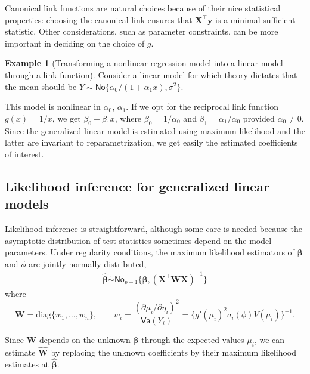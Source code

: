 \documentclass[
  11pt,
  letterpaper,
]{book}
\theoremstyle{definition}
\theoremstyle{definition}
\newtheorem{example}{Example}[chapter]
\theoremstyle{definition}
\theoremstyle{definition}
\theoremstyle{remark}
\begin{document}
Canonical link functions are natural choices because of their nice
statistical properties: choosing the canonical link ensures that
\(\mathbf{X}^\top\boldsymbol{y}\) is a minimal sufficient statistic. Other
considerations, such as parameter constraints, can be more important in
deciding on the choice of \(g\).

\begin{example}[Transforming a nonlinear regression model into a linear model through a link function]
\protect\hypertarget{exm:inverslinklm}{}{\label{exm:inverslinklm} {} }
Consider a linear model for which theory dictates that the mean should be \(Y \sim \mathsf{No}\{\alpha_0/(1+\alpha_1x), \sigma^2\}\).

This model is nonlinear in \(\alpha_0\), \(\alpha_1\). If we opt for the reciprocal link function \(g(x)=1/x\), we get \(\beta_0+\beta_1 x\), where \(\beta_0 = 1/\alpha_0\) and \(\beta_1 = \alpha_1/\alpha_0\) provided \(\alpha_0 \neq 0\). Since the generalized linear model is estimated using maximum likelihood and the latter are invariant to reparametrization, we get easily the estimated coefficients of interest.
\end{example}

\hypertarget{likelihood-inference-for-generalized-linear-models}{%
\subsection{Likelihood inference for generalized linear models}\label{likelihood-inference-for-generalized-linear-models}}

Likelihood inference is straightforward, although some care is needed because the asymptotic distribution of test statistics sometimes depend on the model parameters. Under regularity conditions, the maximum likelihood estimators of \(\boldsymbol{\beta}\) and \(\phi\) are jointly normally distributed,
\begin{align*}
\widehat{\boldsymbol{\beta}} \stackrel{\cdot}{\sim}\mathsf{No}_{p+1}\{\boldsymbol{\beta}, (\mathbf{X}^\top\mathbf{W}\mathbf{X})^{-1}\}
\end{align*}
where
\[\mathbf{W} = \mathrm{diag}\{w_1,\ldots, w_n\}, \qquad w_i = \frac{\left(\partial \mu_i/\partial \eta_i\right)^2}{\mathsf{Va}(Y_i)}=\{g'(\mu_i)^2a_i(\phi)V(\mu_i)\}^{-1}.
\]

Since \(\mathbf{W}\) depends on the unknown \(\boldsymbol{\beta}\) through
the expected values \(\mu_i\), we can estimate \(\widehat{\mathbf{W}}\) by
replacing the unknown coefficients by their maximum likelihood estimates
at \(\widehat{\boldsymbol{\beta}}\).
\end{document}
